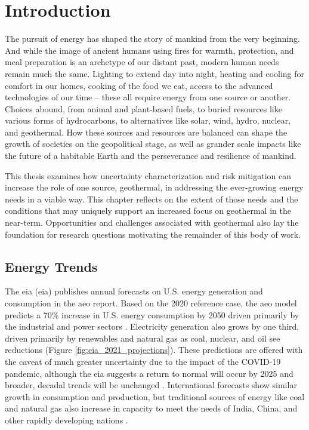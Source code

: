 \chapter{Introduction}\label{ch1:intro}
The pursuit of energy has shaped the story of mankind from the very beginning. And while the image of ancient humans using fires for warmth, protection, and meal preparation is an archetype of our distant past, modern human needs remain much the same. Lighting to extend day into night, heating and cooling for comfort in our homes, cooking of the food we eat, access to the advanced technologies of our time – these all require energy from one source or another.  Choices abound, from animal and plant-based fuels, to buried resources like various forms of hydrocarbons, to alternatives like solar, wind, hydro, nuclear, and geothermal. How these sources and resources are balanced can shape the growth of societies on the geopolitical stage, as well as grander scale impacts like the future of a habitable Earth and the perseverance and resilience of mankind.

This thesis examines how uncertainty characterization and risk mitigation can increase the role of one source, geothermal, in addressing the ever-growing energy needs in a viable way. This chapter reflects on the extent of those needs and the conditions that may uniquely support an increased focus on geothermal in the near-term. Opportunities and challenges associated with geothermal also lay the foundation for research questions motivating the remainder of this body of work.

\section{Energy Trends}\label{ch1:trends}
The \acrlong{eia} (\acrshort{eia}) publishes annual forecasts on U.S. energy generation and consumption in the \acrlong{aeo} report. Based on the 2020 reference case, the \acrshort{aeo} model predicts a 70\% increase in U.S. energy consumption by 2050 driven primarily by the industrial and power sectors \citep{us_energy_information_administration_annual_2021}. Electricity generation also grows by one third, driven primarily by renewables and natural gas as coal, nuclear, and oil see reductions (Figure \ref{fig:eia_2021_projections}). These predictions are offered with the caveat of much greater uncertainty due to the impact of the COVID-19 pandemic, although the \acrshort{eia} suggests a return to normal will occur by 2025 and broader, decadal trends will be unchanged \citep{us_energy_information_administration_annual_2021}. International forecasts show similar growth in consumption and production, but traditional sources of energy like coal and natural gas also increase in capacity to meet the needs of India, China, and other rapidly developing nations \citep{us_energy_information_administration_international_2020}. 
 
